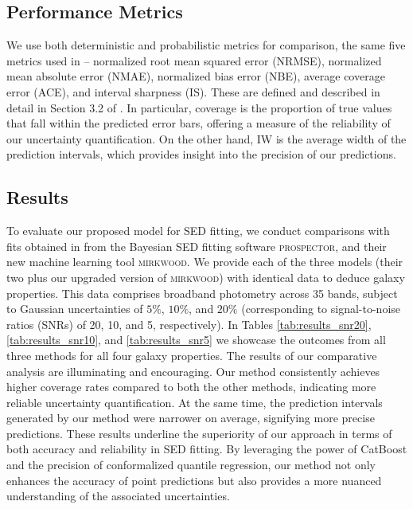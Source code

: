 \documentclass[letterpaper]{article} %
\begin{document}
\vspace{-1.53mm}
\subsection{Performance Metrics}
We use both deterministic and probabilistic metrics for comparison, the same five metrics used in \citet{Gilda21} -- normalized root mean squared error (NRMSE), normalized mean absolute error (NMAE), normalized bias error (NBE), average coverage error (ACE), and interval sharpness (IS). These are defined and described in detail in Section 3.2 of \citet{Gilda21}. In particular, coverage is the proportion of true values that fall within the predicted error bars, offering a measure of the reliability of our uncertainty quantification. On the other hand, IW is the average width of the prediction intervals, which provides insight into the precision of our predictions.

\vspace{-1.46mm}
\subsection{Results}
To evaluate our proposed model for SED fitting, we conduct comparisons with fits obtained in \citet{Gilda21} from the Bayesian SED fitting software \textsc{prospector}, and their new machine learning tool \textsc{mirkwood}. We provide each of the three models (their two plus our upgraded version of \textsc{mirkwood}) with identical data to deduce galaxy properties. This data comprises broadband photometry across 35 bands, subject to Gaussian uncertainties of $5\%$, $10\%$, and $20\%$ (corresponding to signal-to-noise ratios (SNRs) of 20, 10, and 5, respectively). In Tables \ref{tab:results_snr20}, \ref{tab:results_snr10}, and \ref{tab:results_snr5} we showcase the outcomes from all three methods for all four galaxy properties.  The results of our comparative analysis are illuminating and encouraging. Our method consistently achieves higher coverage rates compared to both the other methods, indicating more reliable uncertainty quantification. At the same time, the prediction intervals generated by our method were narrower on average, signifying more precise predictions.  These results underline the superiority of our approach in terms of both accuracy and reliability in SED fitting. By leveraging the power of CatBoost and the precision of conformalized quantile regression, our method not only enhances the accuracy of point predictions but also provides a more nuanced understanding of the associated uncertainties.
\end{document}
